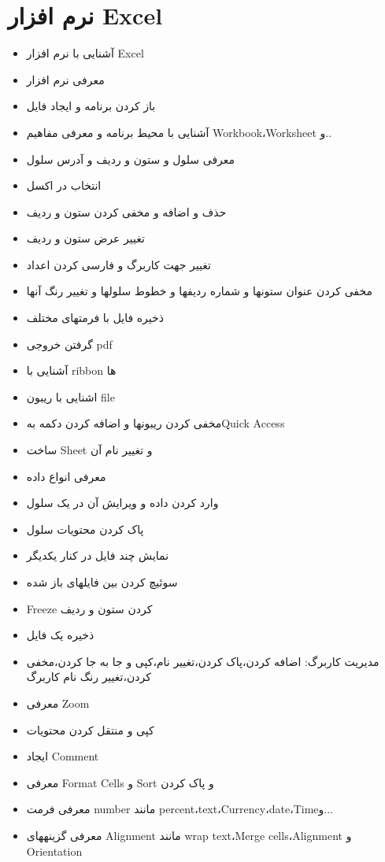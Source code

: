 \section{ نرم افزار Excel}
\begin{itemize}
\item
آشنایی با نرم افزار Excel
\item
معرفی نرم افزار
\item
باز کردن برنامه و ایجاد فایل
\item
آشنایی با محیط برنامه و معرفی مفاهیم Workbook،Worksheet و..
\item
معرفی سلول و ستون و ردیف و آدرس سلول
\item
انتخاب در اکسل
\item
حذف و اضافه و مخفی کردن ستون و ردیف
\item
تغییر عرض ستون و ردیف
\item
تغییر جهت کاربرگ و فارسی کردن اعداد
\item
مخفی کردن عنوان ستونها و شماره ردیفها و خطوط سلولها و تغییر رنگ آنها
\item
ذخیره فایل با فرمتهای مختلف
\item
گرفتن خروجی pdf
\item
آشنایی با ribbon ها
\item
اشنایی با ریبون file
\item
مخفی کردن ریبون­ها و اضافه کردن دکمه بهQuick Access
\item
ساخت Sheet و تغییر نام آن
\item
معرفی انواع داده
\item
وارد کردن داده و ویرایش آن در یک سلول
\item
پاک کردن محتویات سلول
\item
نمایش چند فایل در کنار یکدیگر
\item
سوئیچ کردن بین فایلهای باز شده
\item
Freeze کردن ستون و ردیف
\item
ذخیره یک فایل
\item
مدیریت کاربرگ: اضافه کردن،پاک کردن،تغییر نام،کپی و جا به جا کردن،مخفی کردن،تغییر رنگ نام کاربرگ
\item
معرفی Zoom
\item
کپی و منتقل کردن محتویات
\item
ایجاد Comment
\item
معرفی Format Cells و Sort و پاک کردن
\item
معرفی فرمت number مانند percent،text،Currency،date،Timeو...
\item
معرفی گزینه­های Alignment مانند wrap text،Merge cells،Alignment و Orientation

\end{itemize}
